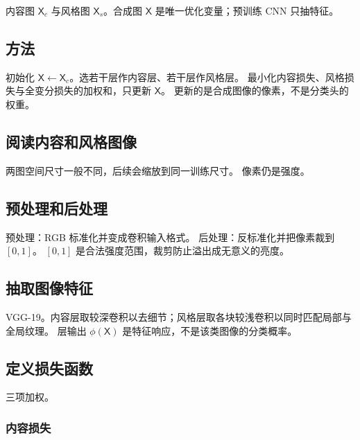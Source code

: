 


内容图 $\mathsf{X}_c$ 与风格图 $\mathsf{X}_s$。合成图 $\mathsf{X}$ 是唯一优化变量；预训练 CNN 只抽特征。

\subsection{方法}

初始化 $\mathsf{X}\leftarrow\mathsf{X}_c$。选若干层作内容层、若干层作风格层。
最小化内容损失、风格损失与全变分损失的加权和，只更新 $\mathsf{X}$。
更新的是合成图像的像素，不是分类头的权重。

\subsection{阅读内容和风格图像}

两图空间尺寸一般不同，后续会缩放到同一训练尺寸。
像素仍是强度。

\subsection{预处理和后处理}

预处理：RGB 标准化并变成卷积输入格式。
后处理：反标准化并把像素裁到 $[0,1]$。
$[0,1]$ 是合法强度范围，裁剪防止溢出成无意义的亮度。

\subsection{抽取图像特征}

VGG-19。内容层取较深卷积以去细节；风格层取各块较浅卷积以同时匹配局部与全局纹理。
层输出 $\phi(\mathsf{X})$ 是特征响应，不是该类图像的分类概率。

\subsection{定义损失函数}

三项加权。

\subsubsection{内容损失}

